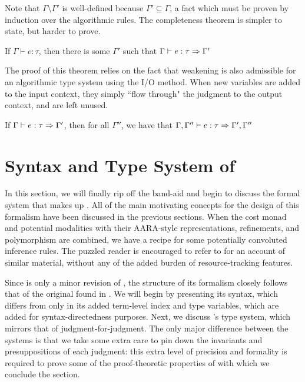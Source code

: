 Note that $\Gamma \setminus \Gamma'$ is well-defined because $\Gamma' \subseteq \Gamma$, a fact which must be proven by induction over the algorithmic rules. The completeness theorem is simpler to state, but harder to prove.

\begin{theorem}
If $\Gamma \vdash e : \tau$, then there is some $\Gamma'$ such that $\Gamma \vdash e : \tau \Rightarrow \Gamma'$
\end{theorem}

The proof of this theorem relies on the fact that weakening is also admissible for an algorithmic type system using the I/O method. When new variables are added to the input context, they simply ``flow through" the judgment to the output context, and are left unused.

\begin{theorem}
If $\Gamma \vdash e : \tau \Rightarrow \Gamma'$, then for all $\Gamma''$, we have that $\Gamma,\Gamma'' \vdash e : \tau \Rightarrow \Gamma',\Gamma''$
\end{theorem}

\section{Syntax and Type System of \dlambdaamor}
\label{sec:dlambdaamor-syntax-and-types}

In this section, we will finally rip off the band-aid and begin to discuss the formal system that makes up \dlambdaamor. All of the main motivating concepts for the design of this formalism have been discussed in the previous sections. When the cost monad and potential modalities with their AARA-style representations, refinements, and polymorphism are combined, we have a recipe for some potentially convoluted inference rules. The puzzled reader is encouraged to refer to \citet{xi:jfp07} for an account of similar material, without any of the added burden of resource-tracking features.

Since \dlambdaamor is only a minor revision of \lambdaamor, the structure of its formalism closely follows that of the original found in \citet{rajani-et-al:popl21}. 
We will begin by presenting its syntax, which differs from \lambdaamor only in its added term-level index and type variables, which are added for syntax-directedness purposes. Next, we discuss \dlambdaamor's type system, which mirrors that of \lambdaamor judgment-for-judgment. The only major difference between the systems is that we take some extra care to pin down the invariants and presuppositions of each judgment: this extra level of precision and formality is required to prove some of the proof-theoretic properties of \dlambdaamor with which we conclude the section.

